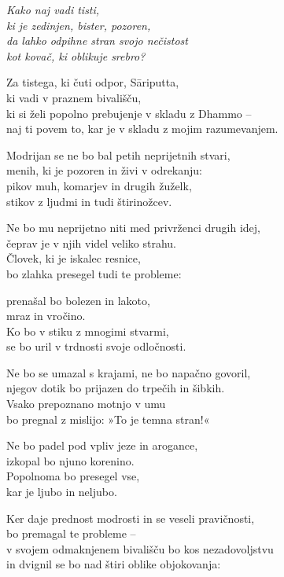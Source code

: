 \emph{Kako naj vadi tisti,}\\
\emph{ki je zedinjen, bister, pozoren,}\\
\emph{da lahko odpihne stran svojo nečistost}\\
\emph{kot kovač, ki oblikuje srebro?}

Za tistega, ki čuti odpor, Sāriputta,\\
ki vadi v praznem bivališču,\\
ki si želi popolno prebujenje v skladu z Dhammo --\\
naj ti povem to, kar je v skladu z mojim razumevanjem.

Modrijan se ne bo bal petih neprijetnih stvari,\\
menih, ki je pozoren in živi v odrekanju:\\
pikov muh, komarjev in drugih žuželk,\\
stikov z ljudmi in tudi štirinožcev.

Ne bo mu neprijetno niti med privrženci drugih idej,\\
čeprav je v njih videl veliko strahu.\\
Človek, ki je iskalec resnice,\\
bo zlahka presegel tudi te probleme:

prenašal bo bolezen in lakoto,\\
mraz in vročino.\\
Ko bo v stiku z mnogimi stvarmi,\\
se bo uril v trdnosti svoje odločnosti.

Ne bo se umazal s krajami, ne bo napačno govoril,\\
njegov dotik bo prijazen do trpečih in šibkih.\\
Vsako prepoznano motnjo v umu\\
bo pregnal z mislijo: »To je temna stran!«

Ne bo padel pod vpliv jeze in arogance,\\
izkopal bo njuno korenino.\\
Popolnoma bo presegel vse,\\
kar je ljubo in neljubo.

Ker daje prednost modrosti in se veseli pravičnosti,\\
bo premagal te probleme --\\
v svojem odmaknjenem bivališču bo kos nezadovoljstvu\\
in dvignil se bo nad štiri oblike objokovanja:

